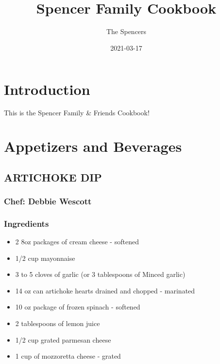 \documentclass[
]{book}
\title{Spencer Family Cookbook}
\author{The Spencers}
\date{2021-03-17}
\providecommand{\tightlist}{%
  \setlength{\itemsep}{0pt}\setlength{\parskip}{0pt}}
\begin{document}
\maketitle

{
\setcounter{tocdepth}{1}
\tableofcontents
}
\hypertarget{introduction}{%
\chapter{Introduction}\label{introduction}}

This is the Spencer Family \& Friends Cookbook!

\hypertarget{appetizers}{%
\chapter{Appetizers and Beverages}\label{appetizers}}

\hypertarget{artichoke-dip}{%
\section*{ARTICHOKE DIP}\label{artichoke-dip}}

\hypertarget{chef-debbie-wescott}{%
\subsection*{Chef: Debbie Wescott}\label{chef-debbie-wescott}}

\hypertarget{ingredients}{%
\subsection*{Ingredients}\label{ingredients}}

\begin{itemize}
\tightlist
\item
  2 8oz packages of cream cheese - softened
\item
  1/2 cup mayonnaise
\item
  3 to 5 cloves of garlic (or 3 tablespoons of Minced garlic)
\item
  14 oz can artichoke hearts drained and chopped - marinated
\item
  10 oz package of frozen spinach - softened
\item
  2 tablespoons of lemon juice
\item
  1/2 cup grated parmesan cheese
\item
  1 cup of mozzoretta cheese - grated
\end{itemize}
\end{document}
